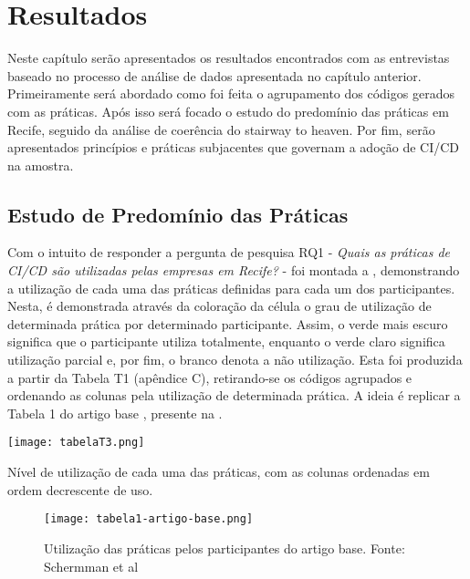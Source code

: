 
\chapter{Resultados}

Neste capítulo serão apresentados os resultados encontrados com as entrevistas baseado no processo de análise de dados apresentada no capítulo anterior. Primeiramente será abordado como foi feita o agrupamento dos códigos gerados com as práticas. Após isso será focado o estudo do predomínio das práticas em Recife, seguido da análise de coerência do stairway to heaven. Por fim, serão apresentados princípios e práticas subjacentes que governam a adoção de CI/CD na amostra.


\section{Estudo de Predomínio das Práticas}

Com o intuito de responder a pergunta de pesquisa RQ1 - \emph{Quais as práticas de CI/CD são utilizadas pelas empresas em Recife?} - foi montada a , demonstrando a utilização de cada uma das práticas definidas para cada um dos participantes. Nesta, é demonstrada através da coloração da célula o grau de utilização de determinada prática por determinado participante. Assim, o verde mais escuro significa que o participante utiliza totalmente, enquanto o verde claro significa utilização parcial e, por fim, o branco denota a não utilização. Esta foi produzida a partir da Tabela T1 (apêndice C), retirando-se os códigos agrupados e ordenando as colunas pela utilização de determinada prática. A ideia é replicar a Tabela 1 do artigo base \cite{empiricalStudy2016}, presente na .

\begin{table}[ht]
\begin{center}
\texttt{[image: tabelaT3.png]}
\end{center}
\caption[Nível de utilização das práticas, com as colunas em ordem decrescente de uso]{
    Nível de utilização de cada uma das práticas, com as colunas ordenadas em ordem decrescente de uso.
}\label{tabela_t3}
\end{table}

\begin{figure}[ht]
\begin{center}
\texttt{[image: tabela1-artigo-base.png]}
\end{center}
\caption[Tabela 1 do artigo base]{
    Utilização das práticas pelos participantes do artigo base.
    Fonte: Schermman et al \cite{empiricalStudy2016}
}\label{tabela_1_artigo_base}
\end{figure}

